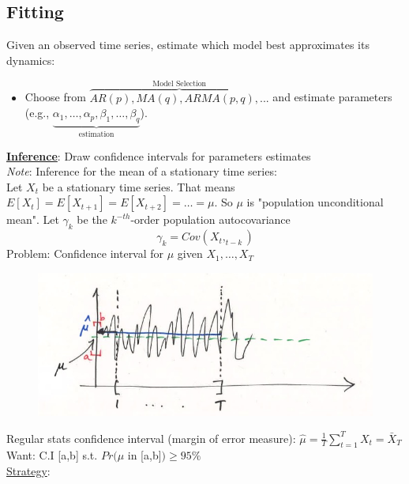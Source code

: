 \subsection{Fitting}

Given an observed time series, estimate which model best approximates its dynamics:\\
\begin{itemize}
    \item Choose from $\overbrace{AR(p),MA(q),ARMA(p,q),...}^\text{Model Selection}$ and estimate parameters (e.g., $\underbrace{\alpha_1,\ldots, \alpha_p, \beta_1,\ldots,\beta_q}_\text{estimation}$).
\end{itemize}

\textbf{\underline{Inference}}: Draw confidence intervals for parameters estimates \\

\textit{Note}: Inference for the mean of a stationary time series:\\

Let $X_t$ be a stationary time series. That means $E[X_t]=E[X_{t+1}]=E[X_{t+2}]=\ldots=\mu $. So $\mu$ is "population unconditional mean". Let $\gamma_k$ be the $k^{-th}$-order population autocovariance
\[
\gamma_k=Cov(X_t,_{t-k})
\]
Problem: Confidence interval for $\mu$ given $X_1,\ldots,X_T$

\begin{figure}[H]
\includegraphics[scale=0.4]{images/Screenshot 2024-03-31 at 16.34.09.jpg}
\centering
\end{figure}

Regular stats confidence interval (margin of error measure): $\hat{\mu}=\frac{1}{T}\sum_{t=1}^T X_t=\bar{X}_T$\\

Want: C.I [a,b] s.t. $Pr(\mu$ in [a,b]$) \geq 95\%$ \\

\underline{Strategy}:

